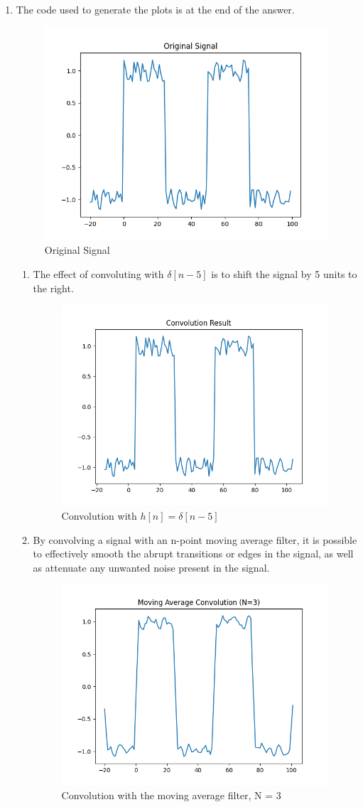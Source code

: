 \documentclass[10pt,a4paper, margin=1in]{article}
\begin{document}
\begin{enumerate}
\item The code used to generate the plots is at the end of the answer.

\begin{figure}[H]    
    \centering
    \caption{Original Signal}
    \includegraphics[width=0.4\linewidth]{images/original.png}
\end{figure}
\begin{enumerate}
    \item The effect of convoluting with $\delta[n-5]$ is to shift the signal by 5 units to the right.
\begin{figure}[H]
    \centering
    \caption{Convolution with $h[n] = \delta[n-5]$}
    \includegraphics[width=0.4\linewidth]{images/convolution.png}
\end{figure}
    \item By convolving a signal with an n-point moving average filter, it is possible to effectively smooth the abrupt transitions or edges in the signal, as well as attenuate any unwanted noise present in the signal.
\begin{figure}[H]
    \centering
    \caption{Convolution with the moving average filter, N = 3}
    \includegraphics[width=0.4\linewidth]{images/moving_average_3.png}
\end{figure}

\end{enumerate}
\end{enumerate}
\end{document}
